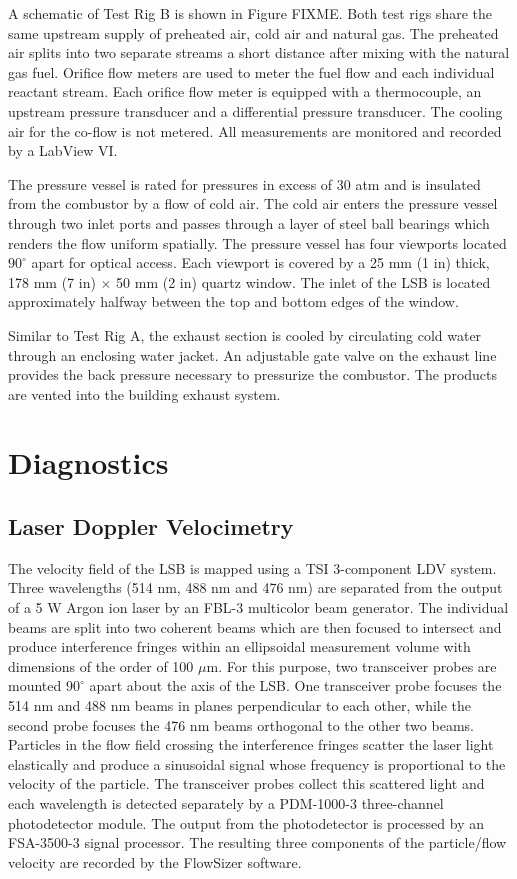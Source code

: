 A schematic of Test Rig B is shown in Figure FIXME.
Both test rigs share the same upstream supply of preheated air, cold air and natural gas.
The preheated air splits into two separate streams a short distance after mixing with the natural gas fuel.
Orifice flow meters are used to meter the fuel flow and each individual reactant stream.
Each orifice flow meter is equipped with a thermocouple, an upstream pressure transducer and a differential pressure transducer.
The cooling air for the co-flow is not metered.
All measurements are monitored and recorded by a LabView VI.

The pressure vessel is rated for pressures in excess of 30 atm and is insulated from the combustor by a flow of cold air.
The cold air enters the pressure vessel through two inlet ports and passes through a layer of steel ball bearings which renders the flow uniform spatially.
The pressure vessel has four viewports located \(90^\circ\) apart for optical access.
Each viewport is covered by a 25 mm (1 in) thick, 178 mm (7 in) \(\times\) 50 mm (2 in) quartz window.
The inlet of the LSB is located approximately halfway between the top and bottom edges of the window.

Similar to Test Rig A, the exhaust section is cooled by circulating cold water through an enclosing water jacket.
An adjustable gate valve on the exhaust line provides the back pressure necessary to pressurize the combustor.
The products are vented into the building exhaust system.

\section{Diagnostics}

\subsection{Laser Doppler Velocimetry}

The velocity field of the LSB is mapped using a TSI 3-component LDV system.
Three wavelengths (514 nm, 488 nm and 476 nm) are separated from the output of a 5 W Argon ion laser by an FBL-3 multicolor beam generator.
The individual beams are split into two coherent beams which are then focused to intersect and produce interference fringes within an ellipsoidal measurement volume with dimensions of the order of 100 \(\mu\)m.
For this purpose, two transceiver probes are mounted \(90^\circ\) apart about the axis of the LSB.
One transceiver probe focuses the 514 nm and 488 nm beams in planes perpendicular to each other, while the second probe focuses the 476 nm beams orthogonal to the other two beams.
Particles in the flow field crossing the interference fringes scatter the laser light elastically and produce a sinusoidal signal whose frequency is proportional to the velocity of the particle.
The transceiver probes collect this scattered light and each wavelength is detected separately by a PDM-1000-3 three-channel photodetector module.
The output from the photodetector is processed by an FSA-3500-3 signal processor.
The resulting three components of the particle/flow velocity are recorded by the FlowSizer software.

